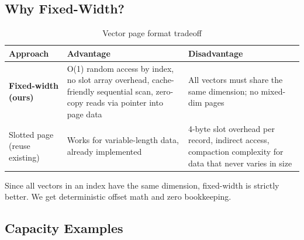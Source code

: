 \documentclass[12pt, a4paper]{report}
\begin{document}
\begin{center}
\end{center}

\subsection{Why Fixed-Width?}

\begin{table}[h]
\centering
\begin{tabularx}{\textwidth}{lXX}
\toprule
\textbf{Approach} & \textbf{Advantage} & \textbf{Disadvantage} \\
\midrule
\textbf{Fixed-width (ours)} &
    O(1) random access by index, no slot array overhead, cache-friendly
    sequential scan, zero-copy reads via pointer into page data &
    All vectors must share the same dimension; no mixed-dim pages \\
\addlinespace
Slotted page (reuse existing) &
    Works for variable-length data, already implemented &
    4-byte slot overhead per record, indirect access,
    compaction complexity for data that never varies in size \\
\bottomrule
\end{tabularx}
\caption{Vector page format tradeoff}
\end{table}

Since all vectors in an index have the same dimension, fixed-width is
strictly better. We get deterministic offset math and zero bookkeeping.

\subsection{Capacity Examples}
\end{document}
